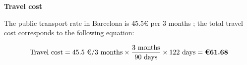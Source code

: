 \textbf{Travel cost}
\vspace{-5pt}

The public transport rate in Barcelona is 45.5€ per 3 months \cite{t-mobilitat-t-jove}; the total travel cost corresponds to the following equation: 

\vspace{-15pt}

\[
\text{Travel cost} = 
45.5 \text{ €/3 months} \times 
\dfrac{3 \text{ months}}{90 \text{ days}} \times 
122 \text{ days} = 
\textbf{\text{€}61.68}
\]


\vspace{-5pt}

